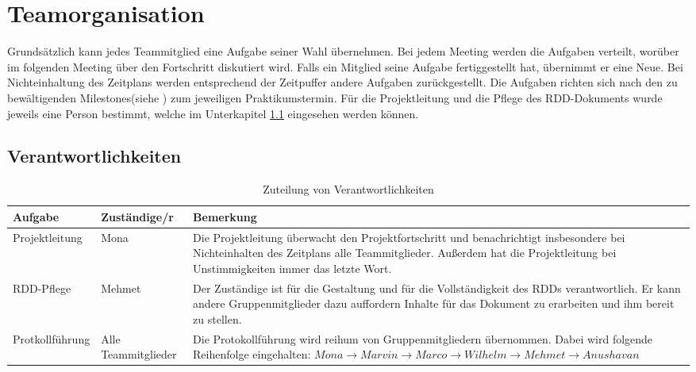 \documentclass[a4paper, 11pt]{article}
\begin{document}
\newpage

\tableofcontents

\newpage

\section{Teamorganisation}
Grundsätzlich kann jedes Teammitglied eine Aufgabe seiner Wahl übernehmen. Bei jedem Meeting werden die Aufgaben verteilt, worüber im folgenden Meeting über den Fortschritt diskutiert wird. Falls ein Mitglied seine Aufgabe fertiggestellt hat, übernimmt er eine Neue. Bei Nichteinhaltung des Zeitplans werden entsprechend der Zeitpuffer andere Aufgaben zurückgestellt. Die Aufgaben richten sich nach den zu bewältigenden Milestones(siehe \cite{esep}) zum jeweiligen Praktikumstermin. Für die Projektleitung und die Pflege des RDD-Dokuments wurde jeweils eine Person bestimmt, welche im Unterkapitel \ref{vantw} eingesehen werden können.

\subsection{Verantwortlichkeiten}\label{vantw}
\begin{table}[h]
\center
\begin{tabularx}{\textwidth}{|l|l|X|}
\hline
\textbf{Aufgabe}&\textbf{Zuständige/r}&\textbf{Bemerkung}\\
\hline
Projektleitung&Mona&Die Projektleitung überwacht den Projektfortschritt und benachrichtigt insbesondere bei Nichteinhalten des Zeitplans alle Teammitglieder. Außerdem hat die Projektleitung bei Unstimmigkeiten immer das letzte Wort. \\
\hline
RDD-Pflege&Mehmet&Der Zuständige ist für die Gestaltung und für die Vollständigkeit des RDDs verantwortlich. Er kann andere Gruppenmitglieder dazu auffordern Inhalte für das Dokument zu erarbeiten und ihm bereit zu stellen. \\
\hline 
Protkollführung&Alle Teammitglieder&Die Protokollführung wird reihum von Gruppenmitgliedern übernommen. Dabei wird folgende Reihenfolge eingehalten: $Mona\rightarrow Marvin\rightarrow Marco \rightarrow Wilhelm\rightarrow Mehmet\rightarrow Anushavan$ \\
\hline
\end{tabularx}
\caption{Zuteilung von Verantwortlichkeiten}
\label{labelname}
\end{table}
\end{document}
